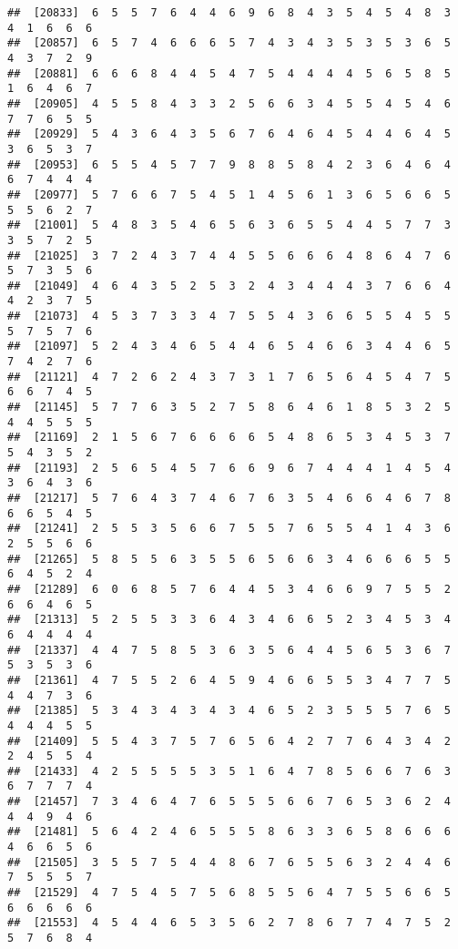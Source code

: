\documentclass[
]{book}
\begin{document}
\begin{verbatim}
##  [20833]  6  5  5  7  6  4  4  6  9  6  8  4  3  5  4  5  4  8  3  4  1  6  6  6
##  [20857]  6  5  7  4  6  6  6  5  7  4  3  4  3  5  3  5  3  6  5  4  3  7  2  9
##  [20881]  6  6  6  8  4  4  5  4  7  5  4  4  4  4  5  6  5  8  5  1  6  4  6  7
##  [20905]  4  5  5  8  4  3  3  2  5  6  6  3  4  5  5  4  5  4  6  7  7  6  5  5
##  [20929]  5  4  3  6  4  3  5  6  7  6  4  6  4  5  4  4  6  4  5  3  6  5  3  7
##  [20953]  6  5  5  4  5  7  7  9  8  8  5  8  4  2  3  6  4  6  4  6  7  4  4  4
##  [20977]  5  7  6  6  7  5  4  5  1  4  5  6  1  3  6  5  6  6  5  5  5  6  2  7
##  [21001]  5  4  8  3  5  4  6  5  6  3  6  5  5  4  4  5  7  7  3  3  5  7  2  5
##  [21025]  3  7  2  4  3  7  4  4  5  5  6  6  6  4  8  6  4  7  6  5  7  3  5  6
##  [21049]  4  6  4  3  5  2  5  3  2  4  3  4  4  4  3  7  6  6  4  4  2  3  7  5
##  [21073]  4  5  3  7  3  3  4  7  5  5  4  3  6  6  5  5  4  5  5  5  7  5  7  6
##  [21097]  5  2  4  3  4  6  5  4  4  6  5  4  6  6  3  4  4  6  5  7  4  2  7  6
##  [21121]  4  7  2  6  2  4  3  7  3  1  7  6  5  6  4  5  4  7  5  6  6  7  4  5
##  [21145]  5  7  7  6  3  5  2  7  5  8  6  4  6  1  8  5  3  2  5  4  4  5  5  5
##  [21169]  2  1  5  6  7  6  6  6  6  5  4  8  6  5  3  4  5  3  7  5  4  3  5  2
##  [21193]  2  5  6  5  4  5  7  6  6  9  6  7  4  4  4  1  4  5  4  3  6  4  3  6
##  [21217]  5  7  6  4  3  7  4  6  7  6  3  5  4  6  6  4  6  7  8  6  6  5  4  5
##  [21241]  2  5  5  3  5  6  6  7  5  5  7  6  5  5  4  1  4  3  6  2  5  5  6  6
##  [21265]  5  8  5  5  6  3  5  5  6  5  6  6  3  4  6  6  6  5  5  6  4  5  2  4
##  [21289]  6  0  6  8  5  7  6  4  4  5  3  4  6  6  9  7  5  5  2  6  6  4  6  5
##  [21313]  5  2  5  5  3  3  6  4  3  4  6  6  5  2  3  4  5  3  4  6  4  4  4  4
##  [21337]  4  4  7  5  8  5  3  6  3  5  6  4  4  5  6  5  3  6  7  5  3  5  3  6
##  [21361]  4  7  5  5  2  6  4  5  9  4  6  6  5  5  3  4  7  7  5  4  4  7  3  6
##  [21385]  5  3  4  3  4  3  4  3  4  6  5  2  3  5  5  5  7  6  5  4  4  4  5  5
##  [21409]  5  5  4  3  7  5  7  6  5  6  4  2  7  7  6  4  3  4  2  2  4  5  5  4
##  [21433]  4  2  5  5  5  5  3  5  1  6  4  7  8  5  6  6  7  6  3  6  7  7  7  4
##  [21457]  7  3  4  6  4  7  6  5  5  5  6  6  7  6  5  3  6  2  4  4  4  9  4  6
##  [21481]  5  6  4  2  4  6  5  5  5  8  6  3  3  6  5  8  6  6  6  4  6  6  5  6
##  [21505]  3  5  5  7  5  4  4  8  6  7  6  5  5  6  3  2  4  4  6  7  5  5  5  7
##  [21529]  4  7  5  4  5  7  5  6  8  5  5  6  4  7  5  5  6  6  5  6  6  6  6  6
##  [21553]  4  5  4  4  6  5  3  5  6  2  7  8  6  7  7  4  7  5  2  5  7  6  8  4

\end{verbatim}
\end{document}
